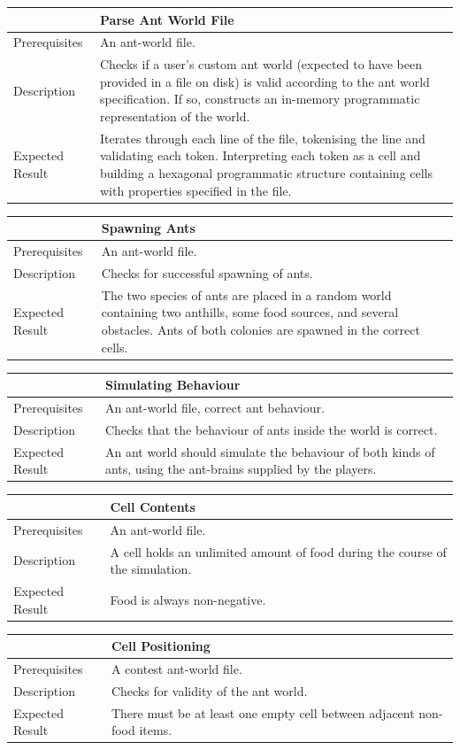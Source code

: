 \documentclass[11pt]{article}
\begin{document}
\begin{longtable}[c]{@{}p{}p{}@{}}
\toprule
& Parse Ant World File \tabularnewline
\midrule
Prerequisites & An ant-world file. \tabularnewline
Description & Checks if a user's custom ant world (expected to have
been provided in a file on disk) is valid according to the ant world
specification. If so, constructs an in-memory programmatic
representation of the world. \tabularnewline
Expected Result & Iterates through each line of the file, tokenising the
line and validating each token. Interpreting each token as a cell and
building a hexagonal programmatic structure containing cells with
properties specified in the file.\tabularnewline
\bottomrule
\end{longtable}

\begin{longtable}[c]{@{}p{}p{}@{}}
\toprule
& Spawning Ants \tabularnewline
\midrule
Prerequisites & An ant-world file. \tabularnewline
Description & Checks for successful spawning of ants. \tabularnewline
Expected Result & The two species of ants are placed in a random world
containing two anthills, some food sources, and several obstacles. Ants of both colonies are spawned in the correct cells. \tabularnewline
\bottomrule
\end{longtable}

\begin{longtable}[c]{@{}p{}p{}@{}}
\toprule
& Simulating Behaviour \tabularnewline
\midrule
Prerequisites & An ant-world file, correct ant behaviour. \tabularnewline
Description & Checks that the behaviour of ants inside the world is correct. \tabularnewline
Expected Result & An ant world should simulate the behaviour of both
kinds of ants, using the ant-brains supplied by the players.\tabularnewline
\bottomrule
\end{longtable}

\begin{longtable}[c]{@{}p{}p{}@{}}
\toprule
& Cell Contents \tabularnewline
\midrule
Prerequisites & An ant-world file.\tabularnewline
Description & A cell holds an unlimited amount of food during the
course of the simulation. \tabularnewline
Expected Result & Food is always non-negative. \tabularnewline
\bottomrule
\end{longtable}

\begin{longtable}[c]{@{}p{}p{}@{}}
\toprule
& Cell Positioning \tabularnewline
\midrule
Prerequisites & A contest ant-world file.\tabularnewline
Description & Checks for validity of the ant world. \tabularnewline
Expected Result & There must be at least one empty cell between adjacent
non-food items. \tabularnewline
\bottomrule
\end{longtable}
\end{document}
